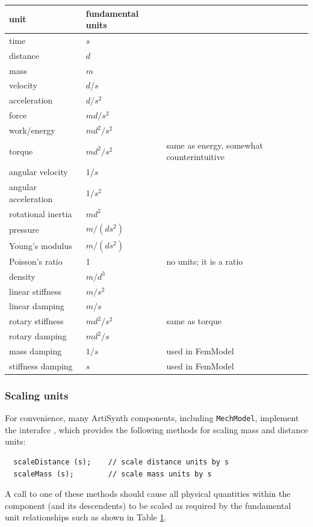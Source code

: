 \begin{table}
\begin{center}
\begin{tabular}{|lll|}
\hline
unit & fundamental units & \\
\hline
time                    & $s$ & \\
distance                & $d$ & \\
mass                    & $m$ & \\
velocity                & $d/s$ & \\
acceleration            & $d/s^2$ & \\
force                   & $m d/s^2$ & \\
work/energy             & $m d^2/s^2$& \\
torque                  & $m d^2/s^2$ & same as energy, somewhat counterintuitive \\
angular velocity        & $1/s$ & \\
angular acceleration    & $1/s^2$ & \\
rotational inertia      & $m d^2$ & \\
pressure                & $m/(d s^2)$ & \\
Young's modulus         & $m/(d s^2)$ & \\
Poisson's ratio         & 1 & no units; it is a ratio \\
density                 & $m/d^3$ & \\
linear stiffness        & $m/s^2$ & \\
linear damping          & $m/s$ & \\
rotary stiffness        & $m d^2/s^2$ & same as torque \\
rotary damping          & $m d^2/s$ & \\
mass damping            & $1/s$ & used in FemModel \\
stiffness damping       & $s$ & used in FemModel \\
\hline
\end{tabular}
\end{center}
\label{Units:tab}
\end{table}

\subsubsection{Scaling units}

For convenience, many ArtiSynth components, including {\tt MechModel},
implement the interafce
, which
provides the following methods for scaling mass and distance units:
%
\begin{lstlisting}
  scaleDistance (s);    // scale distance units by s
  scaleMass (s);        // scale mass units by s
\end{lstlisting}
%
A call to one of these methods should cause all physical quantities
within the component (and its descendents) to be
scaled as required by the fundamental unit relationships such
as shown in Table \ref{Units:tab}.

